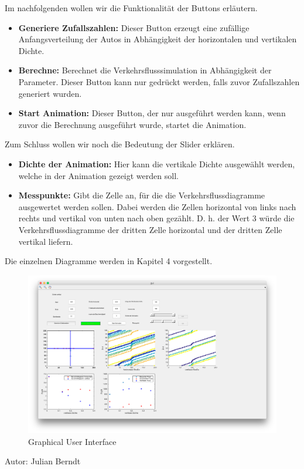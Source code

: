 Im nachfolgenden wollen wir die Funktionalität der Buttons erläutern.
\begin{itemize}
\item[] \textbf{Generiere Zufallszahlen:} Dieser Button erzeugt eine zufällige Anfangsverteilung der Autos in Abhängigkeit der horizontalen und vertikalen Dichte. 
\item[] \textbf{Berechne:} Berechnet die Verkehrsflusssimulation in Abhängigkeit der Parameter. Dieser Button kann nur gedrückt werden, falls zuvor Zufallszahlen generiert wurden.
\item[] \textbf{Start Animation:} Dieser Button, der nur ausgeführt werden kann, wenn zuvor die Berechnung ausgeführt wurde, startet die Animation. 
\end{itemize}
Zum Schluss wollen wir noch die Bedeutung der Slider erklären.
\begin{itemize}
\item[] \textbf{Dichte der Animation:} Hier kann die vertikale Dichte ausgewählt werden, welche in der Animation gezeigt werden soll.
\item[] \textbf{Messpunkte:} Gibt die Zelle an, für die die Verkehrsflussdiagramme ausgewertet werden sollen. Dabei werden die Zellen horizontal von links nach rechts und vertikal von unten nach oben gezählt. D. h. der Wert 3 würde die Verkehrsflussdiagramme der dritten Zelle horizontal und der dritten Zelle vertikal liefern. 
\end{itemize}
Die einzelnen Diagramme werden in Kapitel 4 vorgestellt. 

\begin{figure}[H]%
\centering
\includegraphics[width=17cm]{programm.png}%
\caption{Graphical User Interface}%
\label{pic:MaxFluss}%
\end{figure} \label{programm}
\noindent
\begin{flushright}
Autor: Julian Berndt
\end{flushright}

